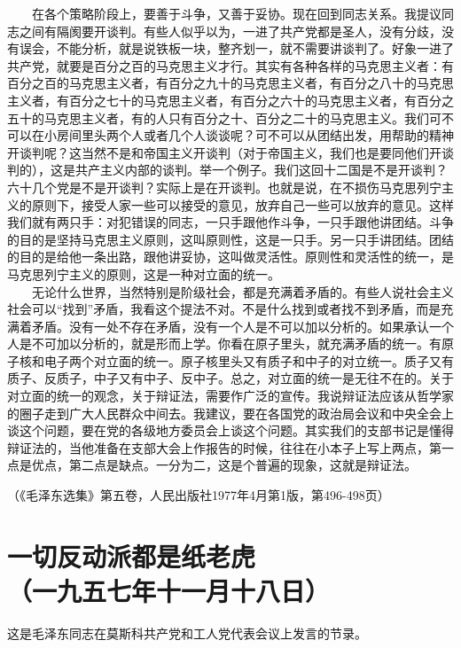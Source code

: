 \documentclass[cn,11pt,chinese]{elegantbook}
\def\myformat#1{\hfil\hfil #1}
\begin{document}
　　在各个策略阶段上，要善于斗争，又善于妥协。现在回到同志关系。我提议同志之间有隔阂要开谈判。有些人似乎以为，一进了共产党都是圣人，没有分歧，没有误会，不能分析，就是说铁板一块，整齐划一，就不需要讲谈判了。好象一进了共产党，就要是百分之百的马克思主义才行。其实有各种各样的马克思主义者：有百分之百的马克思主义者，有百分之九十的马克思主义者，有百分之八十的马克思主义者，有百分之七十的马克思主义者，有百分之六十的马克思主义者，有百分之五十的马克思主义者，有的人只有百分之十、百分之二十的马克思主义。我们可不可以在小房间里头两个人或者几个人谈谈呢？可不可以从团结出发，用帮助的精神开谈判呢？这当然不是和帝国主义开谈判（对于帝国主义，我们也是要同他们开谈判的），这是共产主义内部的谈判。举一个例子。我们这回十二国是不是开谈判？六十几个党是不是开谈判？实际上是在开谈判。也就是说，在不损伤马克思列宁主义的原则下，接受人家一些可以接受的意见，放弃自己一些可以放弃的意见。这样我们就有两只手：对犯错误的同志，一只手跟他作斗争，一只手跟他讲团结。斗争的目的是坚持马克思主义原则，这叫原则性，这是一只手。另一只手讲团结。团结的目的是给他一条出路，跟他讲妥协，这叫做灵活性。原则性和灵活性的统一，是马克思列宁主义的原则，这是一种对立面的统一。\\
　　无论什么世界，当然特别是阶级社会，都是充满着矛盾的。有些人说社会主义社会可以“找到”矛盾，我看这个提法不对。不是什么找到或者找不到矛盾，而是充满着矛盾。没有一处不存在矛盾，没有一个人是不可以加以分析的。如果承认一个人是不可加以分析的，就是形而上学。你看在原子里头，就充满矛盾的统一。有原子核和电子两个对立面的统一。原子核里头又有质子和中子的对立统一。质子又有质子、反质子，中子又有中子、反中子。总之，对立面的统一是无往不在的。关于对立面的统一的观念，关于辩证法，需要作广泛的宣传。我说辩证法应该从哲学家的圈子走到广大人民群众中间去。我建议，要在各国党的政治局会议和中央全会上谈这个问题，要在党的各级地方委员会上谈这个问题。其实我们的支部书记是懂得辩证法的，当他准备在支部大会上作报告的时候，往往在小本子上写上两点，第一点是优点，第二点是缺点。一分为二，这是个普遍的现象，这就是辩证法。\\
\begin{flushright}（《毛泽东选集》第五卷，人民出版社1977年4月第1版，第496-498页）\end{flushright}
\newpage\section*{\myformat{一切反动派都是纸老虎}\\\myformat{（一九五七年十一月十八日）}}
\begin{introduction}\item  这是毛泽东同志在莫斯科共产党和工人党代表会议上发言的节录。\end{introduction}
\end{document}
